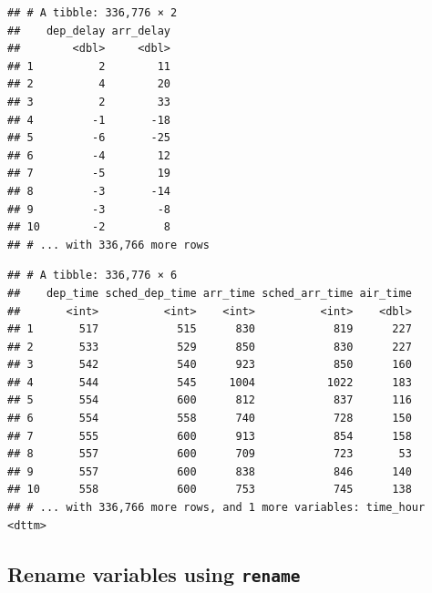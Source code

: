 \documentclass[]{tufte-book}
\newenvironment{Shaded}{\begin{snugshade}}{\end{snugshade}}
\newcommand{\KeywordTok}[1]{\textcolor[rgb]{0.13,0.29,0.53}{\textbf{{#1}}}}
\newcommand{\StringTok}[1]{\textcolor[rgb]{0.31,0.60,0.02}{{#1}}}
\newcommand{\NormalTok}[1]{{#1}}
\begin{document}
\begin{Shaded}
\end{Shaded}

\begin{verbatim}
## # A tibble: 336,776 × 2
##    dep_delay arr_delay
##        <dbl>     <dbl>
## 1          2        11
## 2          4        20
## 3          2        33
## 4         -1       -18
## 5         -6       -25
## 6         -4        12
## 7         -5        19
## 8         -3       -14
## 9         -3        -8
## 10        -2         8
## # ... with 336,766 more rows
\end{verbatim}

\begin{Shaded}
\end{Shaded}

\begin{verbatim}
## # A tibble: 336,776 × 6
##    dep_time sched_dep_time arr_time sched_arr_time air_time
##       <int>          <int>    <int>          <int>    <dbl>
## 1       517            515      830            819      227
## 2       533            529      850            830      227
## 3       542            540      923            850      160
## 4       544            545     1004           1022      183
## 5       554            600      812            837      116
## 6       554            558      740            728      150
## 7       555            600      913            854      158
## 8       557            600      709            723       53
## 9       557            600      838            846      140
## 10      558            600      753            745      138
## # ... with 336,766 more rows, and 1 more variables: time_hour <dttm>
\end{verbatim}

\subsection{\texorpdfstring{Rename variables using
\texttt{rename}}{Rename variables using rename}}\label{rename-variables-using-rename}
\end{document}
